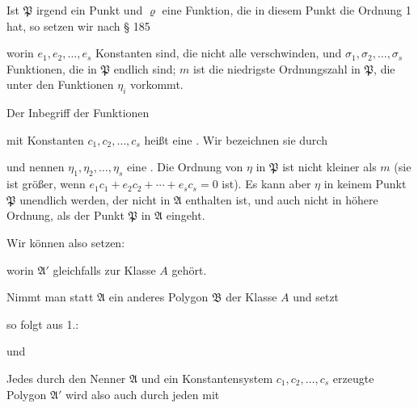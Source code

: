 
Ist $\mathfrak{P}$ irgend ein Punkt und $\varrho$ eine Funktion, die in diesem
Punkt die Ordnung 1 hat, so setzen wir nach § 185


worin $e_1, e_2, \ldots, e_s$ Konstanten sind, die nicht alle verschwinden,
und $\sigma_1, \sigma_2, \ldots, \sigma_s$ Funktionen, die in $\mathfrak{P}$ endlich sind;
$m$ ist die niedrigste Ordnungszahl in $\mathfrak{P}$, die unter den Funktionen $\eta_i$ vorkommt.

Der Inbegriff der Funktionen


mit Konstanten $c_1, c_2, \ldots, c_s$ heißt eine . Wir bezeichnen sie durch


und nennen $\eta_1, \eta_2, \ldots, \eta_s$ eine . Die Ordnung
von $\eta$ in $\mathfrak{P}$ ist nicht kleiner als $m$ (sie ist größer, wenn
$e_1c_1 + e_2c_2 + \cdots + e_sc_s = 0$ ist). Es kann aber $\eta$ in keinem
Punkt $\mathfrak{P}$ unendlich werden, der nicht in $\mathfrak{A}$ enthalten ist, und
auch nicht in höhere Ordnung, als der Punkt $\mathfrak{P}$ in $\mathfrak{A}$ eingeht.

Wir können also setzen:


worin $\mathfrak{A}'$ gleichfalls zur Klasse $A$ gehört.

Nimmt man statt $\mathfrak{A}$ ein anderes Polygon $\mathfrak{B}$ der Klasse $A$
und setzt


so folgt aus 1.:


und


Jedes durch den Nenner $\mathfrak{A}$ und ein Konstantensystem $c_1,
c_2, \ldots, c_s$ erzeugte Polygon $\mathfrak{A}'$ wird also auch durch jeden mit
